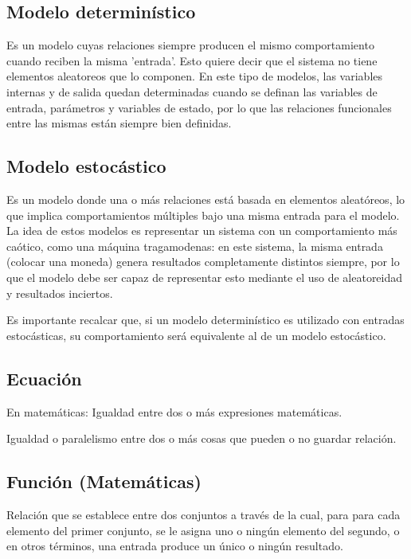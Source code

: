 
\subsection{Modelo determinístico}
Es un modelo cuyas relaciones siempre producen el mismo comportamiento cuando reciben la misma 'entrada'. Esto quiere decir que el sistema no tiene elementos aleatoreos que lo componen. En este tipo de modelos, las variables internas y de salida quedan determinadas cuando se definan las variables de entrada, parámetros y variables de estado, por lo que las relaciones funcionales entre las mismas están siempre bien definidas.


\subsection{Modelo estocástico}
Es un modelo donde una o más relaciones está basada en elementos aleatóreos, lo que implica comportamientos múltiples bajo una misma entrada para el modelo. La idea de estos modelos es representar un sistema con un comportamiento más caótico, como una máquina tragamodenas: en este sistema, la misma entrada (colocar una moneda) genera resultados completamente distintos siempre, por lo que el modelo debe ser capaz de representar esto mediante el uso de aleatoreidad y resultados inciertos.

Es importante recalcar que, si un modelo determinístico es utilizado con entradas estocásticas, su comportamiento será equivalente al de un modelo estocástico.


\subsection{Ecuación}
En matemáticas: Igualdad entre dos o más expresiones matemáticas.

Igualdad o paralelismo entre dos o más cosas que pueden o no guardar relación.


\subsection{Función (Matemáticas)}
Relación que se establece entre dos conjuntos a través de la cual, para para cada elemento del primer conjunto, se le asigna uno o ningún elemento del segundo, o en otros términos, una entrada produce un único o ningún resultado.

